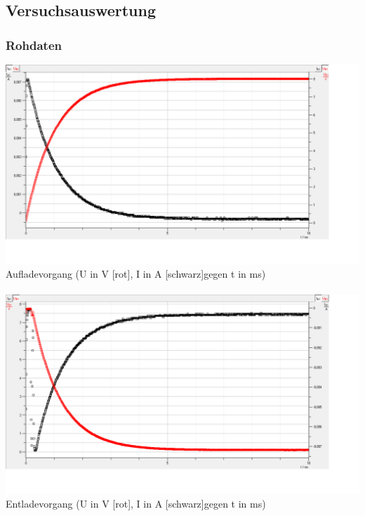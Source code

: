 \documentclass[12pt,a4paper]{article}
\begin{document}
\subsection{Versuchsauswertung}
\subsubsection{Rohdaten}
\includegraphics[scale=0.35]{auf1.png}\\
Aufladevorgang (U in V [rot], I in A [schwarz]gegen t in ms)\\
\\
\includegraphics[scale=0.35]{ent1.png}\\
Entladevorgang (U in V [rot], I in A [schwarz]gegen t in ms)\\
\end{document}
